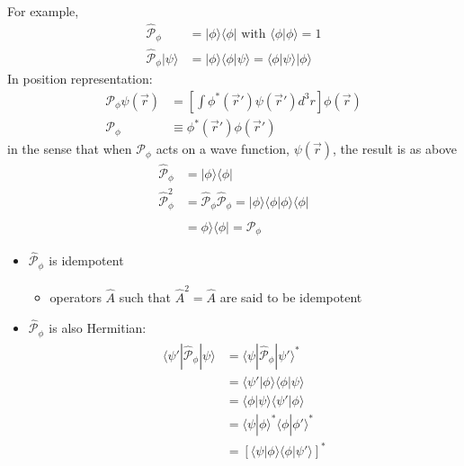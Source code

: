 \documentclass[a4paper,11pt,normalem]{article}
\begin{document}
For example,
\[
    \begin{aligned}
    \hat{\mathcal{P}}_{\phi} &= |\phi\rangle\langle\phi| \text{ with } \langle\phi|\phi\rangle = 1 \\
    \hat{\mathcal{P}}_{\phi}|\psi\rangle &= |\phi\rangle\langle\phi|\psi\rangle = \langle\phi|\psi\rangle|\phi\rangle
    \end{aligned}
\]
In position representation:
\[
    \begin{aligned}
    \mathcal{P}_{\phi}\psi(\vec{r}) &= \left[\int \phi^*(\vec{r}')\psi(\vec{r}') d^3r\right]\phi(\vec{r}) \\
    \mathcal{P}_{\phi} &\equiv \phi^*(\vec{r}')\phi(\vec{r}')
    \end{aligned}
\]
in the sense that when \(\mathcal{P}_{\phi_{}}\) acts on a wave
function, \(\psi(\vec{r})\), the result is as above
\[
    \begin{aligned}
    \hat{\mathcal{P}}_\phi &= |\phi\rangle\langle\phi| \\
    \hat{\mathcal{P}}^2_\phi &= \hat{\mathcal{P}}_\phi\hat{\mathcal{P}}_\phi = |\phi\rangle\langle\phi|\phi\rangle\langle\phi| \\
    &= \phi\rangle\langle\phi| = \hat{\mathcal{P}}_\phi
    \end{aligned}
\]
\begin{itemize}
\item
  \(\hat{\mathcal{P}}_{\phi_{}}\) is idempotent
  \begin{itemize}
  \item
    operators \(\hat{A}\) such that \(\hat{A}^2 = \hat{A}\) are said to
    be idempotent
  \end{itemize}
\item
  \(\hat{\mathcal{P}}_{\phi_{}}\) is also Hermitian:
\[
    \begin{aligned}
    \langle\psi'|\hat{\mathcal{P}}_{\phi}|\psi\rangle &= \langle\psi|\hat{\mathcal{P}}_{\phi}|\psi'\rangle^{ * } \\
    &= \langle\psi'|\phi\rangle\langle\phi|\psi\rangle \\
    &= \langle\phi|\psi\rangle\langle\psi'|\phi\rangle \\
    &= \langle\psi|\phi\rangle^{ * }\langle\phi|\phi'\rangle^{ * } \\
    &= [\langle\psi|\phi\rangle\langle\phi|\psi'\rangle]^{ * }
    \end{aligned}
\]
\end{itemize}
\end{document}
